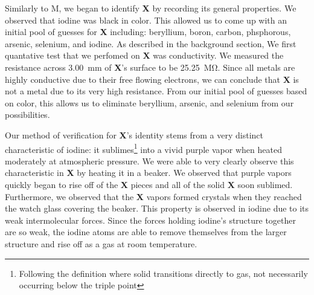\documentclass[titlepage]{article}
\begin{document}
\bigskip
Similarly to M, we began to identify \textbf{X} by recording its general properties. We observed that iodine was black in color. This allowed us to come up with an initial pool of guesses for \textbf{X} including: beryllium, boron, carbon, phsphorous, arsenic, selenium, and iodine. As described in the background section, We first quantative test that we perfomed on \textbf{X} was conductivity. We measured the resistance across \qty{3.00}{\mm} of \textbf{X}'s surface to be \qty{25.25}{\mega\ohm}. Since all metals are highly conductive due to their free flowing electrons, we can conclude that \textbf{X} is not a metal due to its very high resistance. From our initial pool of guesses based on color, this allows us to eliminate beryllium, arsenic, and selenium from our possibilities. 

Our method of verification for \textbf{X}'s identity stems from a very distinct characteristic of iodine: it sublimes\footnote{Following the definition where solid transitions directly to gas, not necessarily occurring below the triple point} into a vivid purple vapor when heated moderately at atmospheric pressure. We were able to very clearly observe this characteristic in \textbf{X} by heating it in a beaker. We observed that purple vapors quickly began to rise off of the \textbf{X} pieces and all of the solid \textbf{X} soon sublimed. Furthermore, we observed that the \textbf{X} vapors formed crystals when they reached the watch glass covering the beaker. This property is observed in iodine due to its weak intermolecular forces. Since the forces holding iodine's structure together are so weak, the iodine atoms are able to remove themselves from the larger structure and rise off as a gas at room temperature. 




% 
% 
% 
\end{document}
